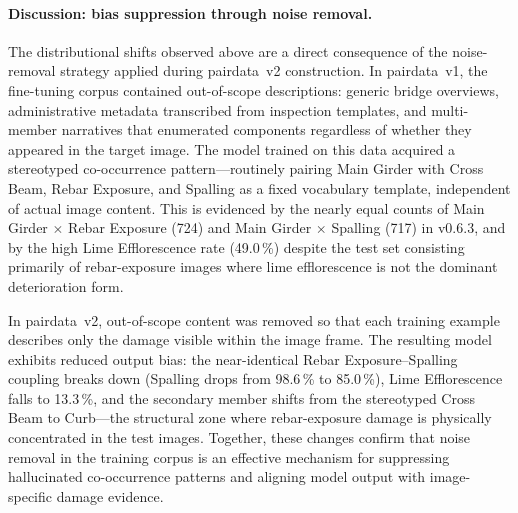 ﻿\documentclass[onecolumn]{article}
\begin{document}
\paragraph{Discussion: bias suppression through noise removal.}
The distributional shifts observed above are a direct consequence of
the noise-removal strategy applied during pairdata~v2 construction.
In pairdata~v1, the fine-tuning corpus contained out-of-scope
descriptions: generic bridge overviews, administrative metadata
transcribed from inspection templates, and multi-member narratives
that enumerated components regardless of whether they appeared
in the target image.
The model trained on this data acquired a stereotyped co-occurrence
pattern---routinely pairing Main Girder with Cross Beam, Rebar
Exposure, and Spalling as a fixed vocabulary template, independent
of actual image content.
This is evidenced by the nearly equal counts of Main Girder $\times$
Rebar Exposure (724) and Main Girder $\times$ Spalling (717) in
v0.6.3, and by the high Lime Efflorescence rate (49.0\,\%) despite
the test set consisting primarily of rebar-exposure images where
lime efflorescence is not the dominant deterioration form.

In pairdata~v2, out-of-scope content was removed so that each
training example describes only the damage visible within the image
frame.
The resulting model exhibits reduced output bias: the near-identical
Rebar Exposure--Spalling coupling breaks down (Spalling drops from
98.6\,\% to 85.0\,\%), Lime Efflorescence falls to 13.3\,\%,
and the secondary member shifts from the stereotyped Cross Beam
to Curb---the structural zone where rebar-exposure damage is
physically concentrated in the test images.
Together, these changes confirm that noise removal in the
training corpus is an effective mechanism for suppressing
hallucinated co-occurrence patterns and aligning model output
with image-specific damage evidence.
\end{document}
